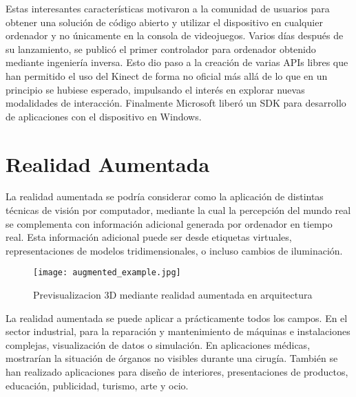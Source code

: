 Estas interesantes características motivaron a la comunidad de usuarios para obtener una solución de código abierto y utilizar el dispositivo en cualquier ordenador y no únicamente en la consola de videojuegos. Varios días después de su lanzamiento, se publicó el primer controlador para ordenador obtenido mediante ingeniería inversa. Esto dio paso a la creación de varias APIs libres que han permitido el uso del Kinect de forma no oficial más allá de lo que en un principio se hubiese esperado, impulsando el interés en explorar nuevas modalidades de interacción. Finalmente Microsoft liberó un SDK para desarrollo de aplicaciones con el dispositivo en Windows.  

\section{Realidad Aumentada}
La realidad aumentada se podría considerar como la aplicación de distintas técnicas de visión por computador, mediante la cual la percepción del mundo real se complementa con información adicional generada por ordenador en tiempo real. Esta información adicional puede ser desde etiquetas virtuales, representaciones de modelos tridimensionales, o incluso cambios de iluminación. 

\begin{figure} 
  \centering
  \texttt{[image: augmented\_example.jpg]}
  \caption{Previsualizacion 3D mediante realidad aumentada en arquitectura}
  \label{fig:ar_example}
\end{figure} 


La realidad aumentada se puede aplicar a prácticamente todos los campos. En el sector industrial, para la reparación y mantenimiento de máquinas e instalaciones complejas, visualización de datos o simulación.  En aplicaciones médicas, mostrarían la situación de órganos no visibles durante una cirugía. También se han realizado aplicaciones para diseño de interiores, presentaciones de productos, educación, publicidad, turismo, arte y ocio. 


